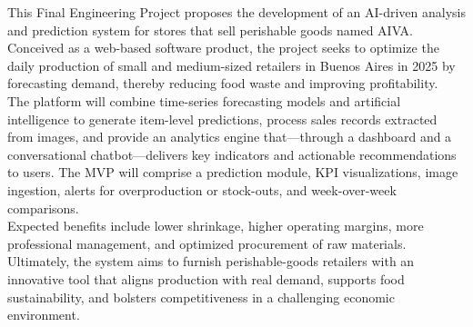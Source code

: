 \begin{Abstract}

    \indent This Final Engineering Project proposes the development of an AI-driven analysis and prediction system for stores that sell perishable goods named AIVA. Conceived as a web-based software product, the project seeks to optimize the daily production of small and medium-sized retailers in Buenos Aires in 2025 by forecasting demand, thereby reducing food waste and improving profitability.\\

    \indent The platform will combine time-series forecasting models and artificial intelligence to generate item-level predictions, process sales records extracted from images, and provide an analytics engine that—through a dashboard and a conversational chatbot—delivers key indicators and actionable recommendations to users. The MVP will comprise a prediction module, KPI visualizations, image ingestion, alerts for overproduction or stock-outs, and week-over-week comparisons.\\
    
    \indent Expected benefits include lower shrinkage, higher operating margins, more professional management, and optimized procurement of raw materials. Ultimately, the system aims to furnish perishable-goods retailers with an innovative tool that aligns production with real demand, supports food sustainability, and bolsters competitiveness in a challenging economic environment.

\end{Abstract}